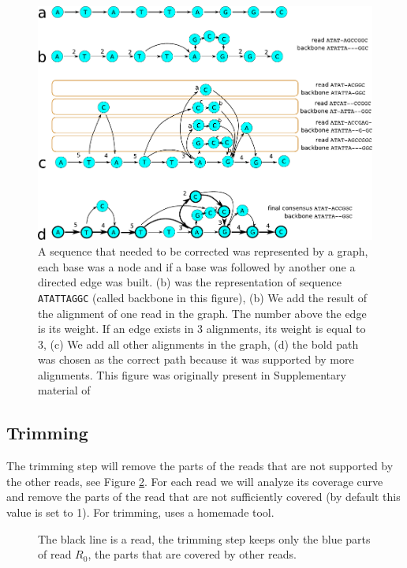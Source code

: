 \documentclass[main]{subfiles}
\begin{document}
\begin{figure}[ht]
    \centering
    \includegraphics[width=\textwidth]{state_of_the_art/images/POA_explain.pdf}
    \caption{A sequence that needed to be corrected was represented by a graph, each base was a node and if a base was followed by another one a directed edge was built. (b) was the representation of sequence \texttt{ATATTAGGC} (called backbone in this figure), (b) We add the result of the alignment of one read in the graph. The number above the edge is its weight. If an edge exists in 3 alignments, its weight is equal to 3, (c) We add all other alignments in the graph, (d) the bold path was chosen as the correct path because it was supported by more alignments. This figure was originally present in Supplementary material of \hgap \cite{hgap}}
    \label{sota:fig:canu:correction}
\end{figure}

\subsection{Trimming}

The trimming step will remove the parts of the reads that are not supported by the other reads, see Figure \ref{sota:fig:canu:trimming}. For each read we will analyze its coverage curve and remove the parts of the read that are not sufficiently covered (by default this value is set to 1). For trimming, \canu uses a homemade tool. 


\begin{figure}[ht]
    \centering
    
    \caption{The black line is a read, the \canu trimming step keeps only the blue parts of read $R_0$, the parts that are covered by other reads.}
    \label{sota:fig:canu:trimming}
\end{figure}
\end{document}
